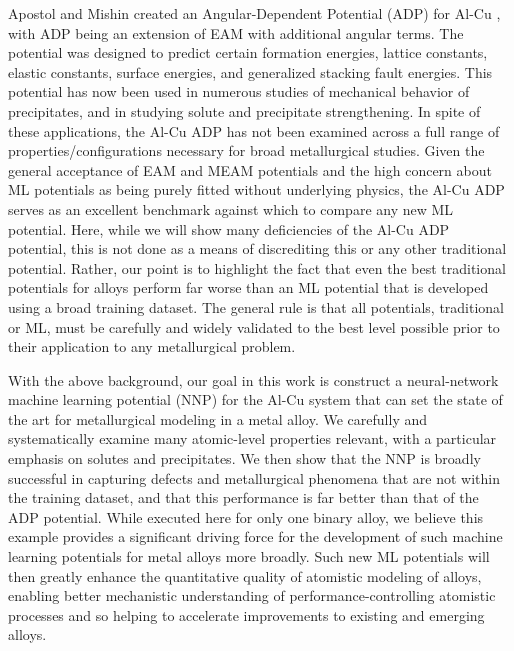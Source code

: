 \documentclass{article}
\begin{document}
Apostol and Mishin created an Angular-Dependent Potential (ADP) for Al-Cu \cite{Apostol2011}, with ADP being an extension of EAM with additional angular terms.  The potential was designed to predict certain formation energies, lattice constants, elastic constants, surface energies, and generalized stacking fault energies.  This potential has now been used in numerous studies of mechanical behavior of precipitates, and in studying solute and precipitate strengthening\cite{Singh2013AnAlloy}\cite{Esteban-Manzanares2019}\cite{Wu2020AtomisticAlloys}. In spite of these applications, the Al-Cu ADP has not been examined across a full range of properties/configurations necessary for broad metallurgical studies.  Given the general acceptance of EAM and MEAM potentials and the high concern about ML potentials as being purely fitted without underlying physics, the Al-Cu ADP serves as an excellent benchmark against which to compare any new ML potential.  Here, while we will show many deficiencies of the Al-Cu ADP potential, this is not done as a means of discrediting this or any other traditional potential.  Rather, our point is to highlight the fact that even the best traditional potentials for alloys perform far worse than an ML potential that is developed using a broad training dataset.  The general rule is that all potentials, traditional or ML, must be carefully and widely validated to the best level possible prior to their application to any metallurgical problem.

With the above background, our goal in this work is construct a neural-network machine learning potential (NNP) for the Al-Cu system that can set the state of the art for metallurgical modeling in a metal alloy.  We carefully and systematically examine many atomic-level properties relevant, with a particular emphasis on solutes and precipitates.  We then show that the NNP is broadly successful in capturing defects and metallurgical phenomena that are not within the training dataset, and that this performance is far better than that of the ADP potential.  While executed here for only one binary alloy, we believe this example provides a significant driving force for the development of such machine learning potentials for metal alloys more broadly.  Such new ML potentials will then greatly enhance the quantitative quality of atomistic modeling of alloys, enabling better mechanistic understanding of performance-controlling atomistic processes and so helping to accelerate improvements to existing and emerging alloys. 

\end{document}
